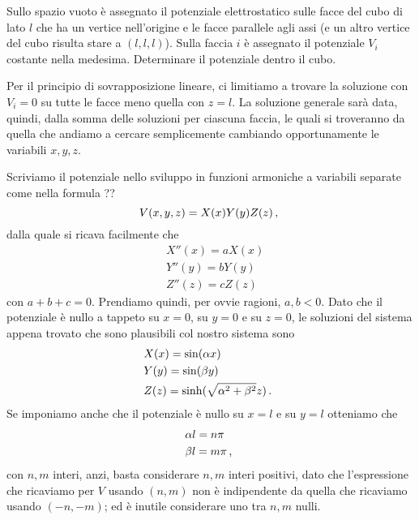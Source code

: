 \documentclass[../main.tex]{subfiles}
\begin{document}

\textex
Sullo spazio vuoto è assegnato il potenziale elettrostatico sulle facce del cubo di lato $l$ che ha un vertice nell'origine e le facce parallele agli assi (e un altro vertice del cubo risulta stare a $(l,l,l)$). Sulla faccia $i$ è assegnato il potenziale $V_i$ costante nella medesima. Determinare il potenziale dentro il cubo.

\solution

Per il principio di sovrapposizione lineare, ci limitiamo a trovare la soluzione con $V_i=0$ su tutte le facce meno quella con $z=l$. La soluzione generale sarà data, quindi, dalla somma delle soluzioni per ciascuna faccia, le quali si troveranno da quella che andiamo a cercare semplicemente cambiando opportunamente le variabili $x,y,z$.

Scriviamo il potenziale nello sviluppo in funzioni armoniche a variabili separate come nella formula ??
\[
	V(x,y,z)=X(x)Y(y)Z(z)\, \text{, }
\]
dalla quale si ricava facilmente che
\begin{align*}
	&X''(x)=aX(x)\\
	&Y''(y)=bY(y)\\
	&Z''(z)=cZ(z)
\end{align*}
con $a+b+c=0$. Prendiamo quindi, per ovvie ragioni, $a,b<0$. Dato che il potenziale è nullo a tappeto su $x=0$, su $y=0$ e su $z=0$, le soluzioni del sistema appena trovato che sono plausibili col nostro sistema sono
\begin{align*}
	&X(x)=\sin(\alpha x)\\
	&Y(y)=\sin(\beta y)\\
	&Z(z)=\sinh(\sqrt{\alpha^2+\beta^2} z)\, \text{. }
\end{align*}
Se imponiamo anche che il potenziale è nullo su $x=l$ e su $y=l$ otteniamo che
\begin{align*}
	&\alpha l = n\pi\\
	&\beta l = m\pi\, \text{, }
\end{align*}
con $n,m$ interi, anzi, basta considerare $n,m$ interi positivi, dato che l'espressione che ricaviamo per $V$ usando $(n,m)$ non è indipendente da quella che ricaviamo usando $(-n,-m)$; ed è inutile considerare uno tra $n,m$ nulli.
\end{document}
